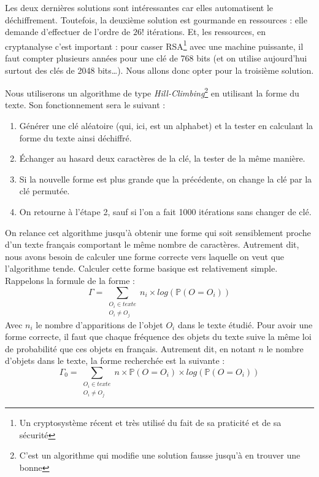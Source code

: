 \documentclass[a4paper, titlepage]{livret}
\begin{document}
Les deux dernières solutions sont intéressantes car elles automatisent le déchiffrement.
Toutefois, la deuxième solution est gourmande en ressources : elle demande d'effectuer de l'ordre de $26!$ itérations. Et, les ressources, en cryptanalyse c'est important : pour casser RSA\footnote{Un cryptosystème récent et très utilisé du fait de sa praticité et de sa sécurité} avec une machine puissante, il faut compter plusieurs années pour une clé de 768 bits (et on utilise aujourd'hui surtout des clés de 2048 bits…).
Nous allons donc opter pour la troisième solution.

Nous utiliserons un algorithme de type \emph{Hill-Climbing}\footnote{C'est un algorithme qui modifie une solution fausse jusqu'à en trouver une bonne} en utilisant la forme du texte.
Son fonctionnement sera le suivant :
\begin{enumerate}
\item Générer une clé aléatoire (qui, ici, est un alphabet) et la tester en calculant la forme du texte ainsi déchiffré.
\item Échanger au hasard deux caractères de la clé, la tester de la même manière. 
\item Si la nouvelle forme est plus grande que la précédente, on change la clé par la clé permutée.
\item On retourne à l'étape 2, sauf si l'on a fait 1000 itérations sans changer de clé.
\end{enumerate}

On relance cet algorithme jusqu'à obtenir une forme qui soit sensiblement proche d'un texte français comportant le même nombre de caractères.
Autrement dit, nous avons besoin de calculer une forme \og correcte \fg{} vers laquelle on veut que l'algorithme tende.
Calculer cette forme \og basique \fg{} est relativement simple.
Rappelons la formule de la forme :
\[ \Gamma = \sum \limits_{\substack{{O_{i} \in texte} \\ O_{i} \neq O_{j}}}  n_{i} \times log(\mathbb{P}(O = O_{i}))\]
Avec $n_{i}$ le nombre d'apparitions de l'objet $O_{i}$ dans le texte étudié.
Pour avoir une forme correcte, il faut que chaque fréquence des objets du texte suive la même loi de probabilité que ces objets en français.
Autrement dit, en notant $n$ le nombre d'objets dans le texte, la forme recherchée est la suivante :
\[ \Gamma_{0} = \sum \limits_{\substack{{O_{i} \in texte} \\ O_{i} \neq O_{j}}}  n \times \mathbb{P}(O = O_{i}) \times log(\mathbb{P}(O = O_{i}))\]
\end{document}
